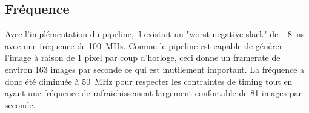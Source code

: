 \documentclass[LPSC_Labo03_SDeriaz]{subfiles}
\begin{document}
\subsection{Fréquence}
Avec l'implémentation du pipeline, il existait un "worst negative slack" de \SI{-8}{\nano\second} avec une fréquence de \SI{100}{\mega\hertz}. Comme le pipeline est capable de générer l'image à raison de 1 pixel par coup d'horloge, ceci donne un framerate de environ 163 images par seconde ce qui est inutilement important. La fréquence a donc été diminuée à \SI{50}{\mega\hertz} pour respecter les contraintes de timing tout en ayant une fréquence de rafraichissement largement confortable de 81 images par seconde.
\end{document}
